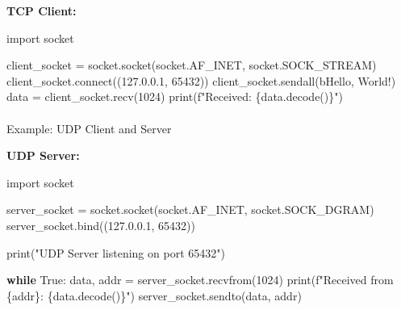 \documentclass[
  letterpaper,
  DIV=11,
  numbers=noendperiod]{scrreprt}
\makeatletter
\let\oldparagraph\paragraph
\renewcommand{\paragraph}{
    \@ifstar
      \xxxParagraphStar
      \xxxParagraphNoStar
  }
\newcommand{\xxxParagraphStar}[1]{\oldparagraph*{#1}\mbox{}}
\newcommand{\xxxParagraphNoStar}[1]{\oldparagraph{#1}\mbox{}}
\newenvironment{Shaded}{\begin{snugshade}}{\end{snugshade}}
\newcommand{\BuiltInTok}[1]{\textcolor[rgb]{0.00,0.23,0.31}{#1}}
\newcommand{\ControlFlowTok}[1]{\textcolor[rgb]{0.00,0.23,0.31}{\textbf{#1}}}
\newcommand{\DecValTok}[1]{\textcolor[rgb]{0.68,0.00,0.00}{#1}}
\newcommand{\ExtensionTok}[1]{\textcolor[rgb]{0.00,0.23,0.31}{#1}}
\newcommand{\ImportTok}[1]{\textcolor[rgb]{0.00,0.46,0.62}{#1}}
\newcommand{\NormalTok}[1]{\textcolor[rgb]{0.00,0.23,0.31}{#1}}
\newcommand{\OperatorTok}[1]{\textcolor[rgb]{0.37,0.37,0.37}{#1}}
\newcommand{\SpecialCharTok}[1]{\textcolor[rgb]{0.37,0.37,0.37}{#1}}
\newcommand{\SpecialStringTok}[1]{\textcolor[rgb]{0.13,0.47,0.30}{#1}}
\newcommand{\StringTok}[1]{\textcolor[rgb]{0.13,0.47,0.30}{#1}}
\newcommand{\VariableTok}[1]{\textcolor[rgb]{0.07,0.07,0.07}{#1}}
\makeatother
\begin{document}
\textbf{TCP Client:}

\begin{Shaded}
\begin{Highlighting}[]
\ImportTok{import}\NormalTok{ socket}

\NormalTok{client\_socket }\OperatorTok{=}\NormalTok{ socket.socket(socket.AF\_INET, socket.SOCK\_STREAM)}
\NormalTok{client\_socket.}\ExtensionTok{connect}\NormalTok{((}\StringTok{\textquotesingle{}127.0.0.1\textquotesingle{}}\NormalTok{, }\DecValTok{65432}\NormalTok{))}
\NormalTok{client\_socket.sendall(}\StringTok{b\textquotesingle{}Hello, World!\textquotesingle{}}\NormalTok{)}
\NormalTok{data }\OperatorTok{=}\NormalTok{ client\_socket.recv(}\DecValTok{1024}\NormalTok{)}
\BuiltInTok{print}\NormalTok{(}\SpecialStringTok{f"Received: }\SpecialCharTok{\{}\NormalTok{data}\SpecialCharTok{.}\NormalTok{decode()}\SpecialCharTok{\}}\SpecialStringTok{"}\NormalTok{)}
\end{Highlighting}
\end{Shaded}

\paragraph{Example: UDP Client and
Server}\label{example-udp-client-and-server}

\textbf{UDP Server:}

\begin{Shaded}
\begin{Highlighting}[]
\ImportTok{import}\NormalTok{ socket}

\NormalTok{server\_socket }\OperatorTok{=}\NormalTok{ socket.socket(socket.AF\_INET, socket.SOCK\_DGRAM)}
\NormalTok{server\_socket.bind((}\StringTok{\textquotesingle{}127.0.0.1\textquotesingle{}}\NormalTok{, }\DecValTok{65432}\NormalTok{))}

\BuiltInTok{print}\NormalTok{(}\StringTok{"UDP Server listening on port 65432"}\NormalTok{)}

\ControlFlowTok{while} \VariableTok{True}\NormalTok{:}
\NormalTok{    data, addr }\OperatorTok{=}\NormalTok{ server\_socket.recvfrom(}\DecValTok{1024}\NormalTok{)}
    \BuiltInTok{print}\NormalTok{(}\SpecialStringTok{f"Received from }\SpecialCharTok{\{}\NormalTok{addr}\SpecialCharTok{\}}\SpecialStringTok{: }\SpecialCharTok{\{}\NormalTok{data}\SpecialCharTok{.}\NormalTok{decode()}\SpecialCharTok{\}}\SpecialStringTok{"}\NormalTok{)}
\NormalTok{    server\_socket.sendto(data, addr)}
\end{Highlighting}
\end{Shaded}
\end{document}
